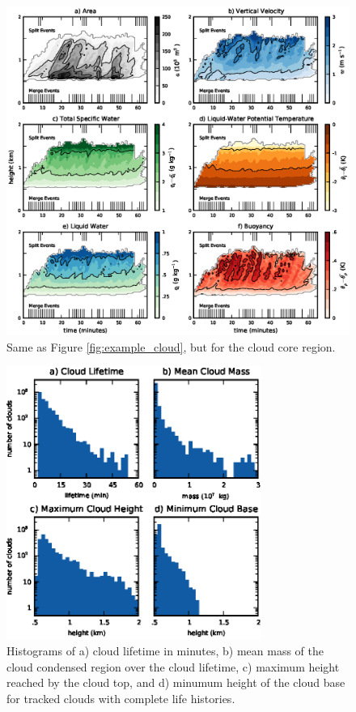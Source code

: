 \documentclass[acp]{copernicus}
\begin{document}
\begin{figure}[t]
\vspace*{2mm}
\begin{center}
\includegraphics[width=\textwidth]{./figures/example_core}
\end{center}
\caption{Same as Figure \ref{fig:example_cloud}, but for the cloud core region.}
\label{fig:example_core}
\end{figure}

\begin{figure}[t]
\vspace*{2mm}
\begin{center}
\includegraphics[width=8.3cm]{./figures/cloud_stats}
\end{center}
\caption{Histograms of a) cloud lifetime in minutes, b) mean mass of the 
cloud condensed region over the cloud lifetime, c) maximum height reached by 
the cloud top, and d) minumum height of the cloud base for tracked clouds with 
complete life histories.}
\label{fig:cloud_stats}
\end{figure}
\end{document}
